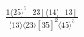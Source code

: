 \documentclass[varwidth, border=5pt]{standalone}
\begin{document}
\begin{my}
$\begin{gathered}
\scriptscriptstyle\frac{1⟨25⟩^3[23]⟨14⟩[13]}{⟨13⟩⟨23⟩[35]^2⟨45⟩^3}
\end{gathered}$
\end{my}
\end{document}
